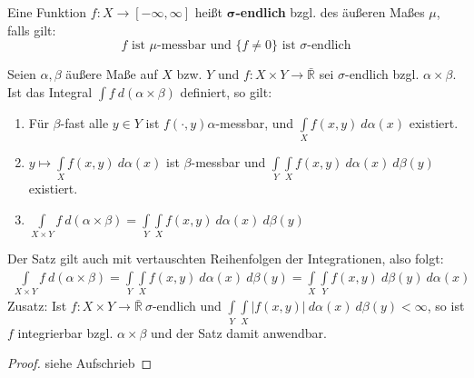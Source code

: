   \begin{definition}
    Eine Funktion $f: X \to [-\infty, \infty]$ heißt $\bm{\sigma}$\textbf{-endlich} bzgl. des äußeren Maßes $\mu$, falls gilt:
    $$f \text{ ist } \mu \text{-messbar und } \{f \neq 0\} \text{ ist } \sigma \text{-endlich}$$
  \end{definition}

  \begin{theorem}[Fubini]
    Seien $\alpha, \beta$ äußere Maße auf $X$ bzw. $Y$ und $f: X \times Y \to \bar{\mathbb{R}}$ sei $\sigma$-endlich bzgl. $\alpha \times \beta$. Ist das Integral $\int f \ d(\alpha \times \beta)$ definiert, so gilt:
    \begin{enumerate}
      \item Für $\beta$-fast alle $y \in Y$ ist $f(\cdot, y) \alpha$-messbar, und $\int\limits_X f(x,y) \ d \alpha(x)$ existiert.
      \item $y \mapsto \int\limits_X f(x,y) \ d\alpha(x)$ ist $\beta$-messbar und $\int\limits_Y \int\limits_X f(x,y) \ d\alpha(x) \ d\beta(y)$ existiert.
      \item $\int\limits_{X\times Y} f \ d(\alpha \times \beta) = \int\limits_Y \int\limits_X f(x,y) \ d\alpha(x) \ d\beta(y)$
    \end{enumerate}
    Der Satz gilt auch mit vertauschten Reihenfolgen der Integrationen, also folgt:
    \begin{align*}
      \int\limits_{X\times Y} f \ d(\alpha \times \beta) = \int\limits_Y \int\limits_X f(x,y) \ d\alpha(x) \ d\beta(y) = \int\limits_X \int\limits_Y f(x,y) \ d\beta(y) \ d\alpha(x)
    \end{align*}
    Zusatz: Ist $f: X \times Y \to \bar{\mathbb{R}} \ \sigma$-endlich und $\int\limits_Y \int\limits_X |f(x,y)| \ d\alpha(x) \ d\beta(y) < \infty$, so ist $f$ integrierbar bzgl. $\alpha \times \beta$ und der Satz damit anwendbar.
  \end{theorem}

  \begin{proof}
    siehe Aufschrieb
  \end{proof}

